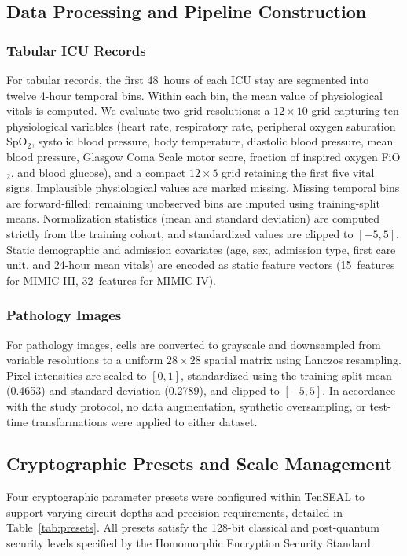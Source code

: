 \documentclass[conference]{IEEEtran}
\begin{document}
\subsection{Data Processing and Pipeline Construction}

\subsubsection{Tabular ICU Records}
For tabular records, the first 48~hours of each ICU stay are segmented into twelve 4-hour temporal bins. Within each bin, the mean value of physiological vitals is computed. We evaluate two grid resolutions: a $12 \times 10$ grid capturing ten physiological variables (heart rate, respiratory rate, peripheral oxygen saturation SpO$_2$, systolic blood pressure, body temperature, diastolic blood pressure, mean blood pressure, Glasgow Coma Scale motor score, fraction of inspired oxygen FiO$_2$, and blood glucose), and a compact $12 \times 5$ grid retaining the first five vital signs. Implausible physiological values are marked missing. Missing temporal bins are forward-filled; remaining unobserved bins are imputed using training-split means. Normalization statistics (mean and standard deviation) are computed strictly from the training cohort, and standardized values are clipped to $[-5, 5]$. Static demographic and admission covariates (age, sex, admission type, first care unit, and 24-hour mean vitals) are encoded as static feature vectors (15~features for MIMIC-III, 32~features for MIMIC-IV).

\subsubsection{Pathology Images}
For pathology images, cells are converted to grayscale and downsampled from variable resolutions to a uniform $28 \times 28$ spatial matrix using Lanczos resampling. Pixel intensities are scaled to $[0, 1]$, standardized using the training-split mean (0.4653) and standard deviation (0.2789), and clipped to $[-5, 5]$. In accordance with the study protocol, no data augmentation, synthetic oversampling, or test-time transformations were applied to either dataset.

\subsection{Cryptographic Presets and Scale Management}

Four cryptographic parameter presets were configured within TenSEAL to support varying circuit depths and precision requirements, detailed in Table~\ref{tab:presets}. All presets satisfy the 128-bit classical and post-quantum security levels specified by the Homomorphic Encryption Security Standard.
\end{document}
